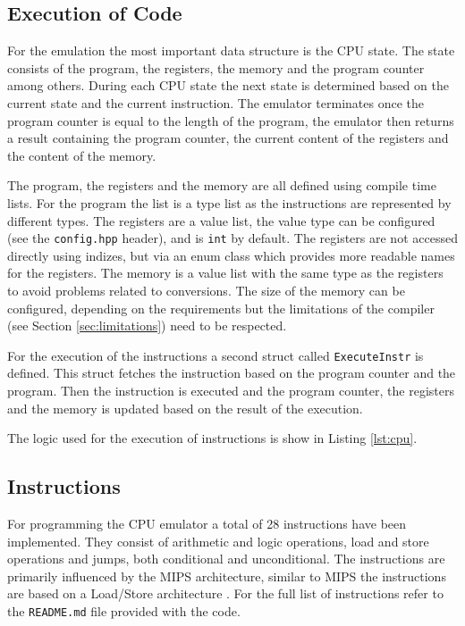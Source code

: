 
\subsection{Execution of Code}
For the emulation the most important data structure is the CPU state. The state consists of the program, the registers,
the memory and the program counter among others. During each CPU state the next state is determined based on the 
current state and the current instruction.
The emulator terminates once the program counter is equal to the length of the program,
the emulator then returns a result containing the program counter, the current content
of the registers and the content of the memory.

The program, the registers and the memory are all defined using  compile time lists.
For the program the list is a type list as the instructions are represented by different
types. The registers are a value list, the value type can be configured (see the
\texttt{config.hpp} header), and is \lstinline{int} by default. The registers are not
accessed directly using indizes, but via an enum class which provides
more readable names for the registers. The memory is a value list with the same type
as the registers to avoid problems related to conversions. The size of the memory
can be configured, depending on the requirements but the limitations of the compiler 
(see Section \ref{sec:limitations}) need to be respected.

For the execution of the instructions a second struct called \lstinline{ExecuteInstr} is defined. 
This struct fetches the instruction based on the program counter and the program. Then
the instruction is executed and the program counter, the registers and the memory is
updated based on the result of the execution.

The logic used for the execution of instructions is show in Listing \ref{lst:cpu}.



\subsection{Instructions}
For programming the CPU emulator a total of 28 instructions have been implemented. They consist of arithmetic and logic
operations, load and store operations and jumps, both conditional and unconditional. The instructions are primarily 
influenced by the MIPS architecture, similar to MIPS the instructions are based
on a Load/Store architecture \cite{mips}. For the full list of instructions refer to the \texttt{README.md} file provided with the code. 


